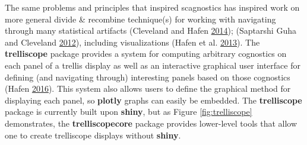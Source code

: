 \documentclass[12pt,]{isuthesis}
\begin{document}
The same problems and principles that inspired scagnostics has inspired
work on more general divide \& recombine technique(s) for working with
navigating through many statistical artifacts (Cleveland and Hafen
\protect\hyperlink{ref-divide-recombine}{2014}); (Saptarshi Guha and
Cleveland \protect\hyperlink{ref-RHIPE}{2012}), including visualizations
(Hafen et al. \protect\hyperlink{ref-trelliscope}{2013}). The
\textbf{trelliscope} package provides a system for computing arbitrary
cognostics on each panel of a trellis display as well as an interactive
graphical user interface for defining (and navigating through)
interesting panels based on those cognostics (Hafen
\protect\hyperlink{ref-trelliscope-pkg}{2016}). This system also allows
users to define the graphical method for displaying each panel, so
\textbf{plotly} graphs can easily be embedded. The \textbf{trelliscope}
package is currently built upon \textbf{shiny}, but as Figure
\ref{fig:trelliscope} demonstrates, the \textbf{trelliscopecore} package
provides lower-level tools that allow one to create trelliscope displays
without \textbf{shiny}.
\end{document}

